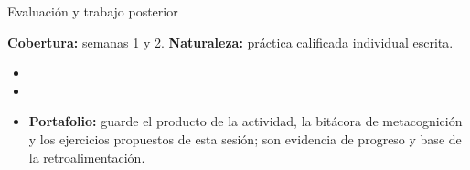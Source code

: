 \documentclass[10pt,aspectratio=169]{beamer}
\begin{document}
\begin{frame}{Evaluación y trabajo posterior}
  \small
  \begin{evalbox}
    \textbf{Cobertura:} semanas 1 y 2. \textbf{Naturaleza:} práctica calificada individual escrita.
  \end{evalbox}
  \begin{itemize}
    \item \criterios
    \item \declaracionia
    \item \textbf{Portafolio:} guarde el producto de la actividad, la bitácora de metacognición y los ejercicios propuestos de esta sesión; son evidencia de progreso y base de la retroalimentación.
  \end{itemize}
\end{frame}
\end{document}

